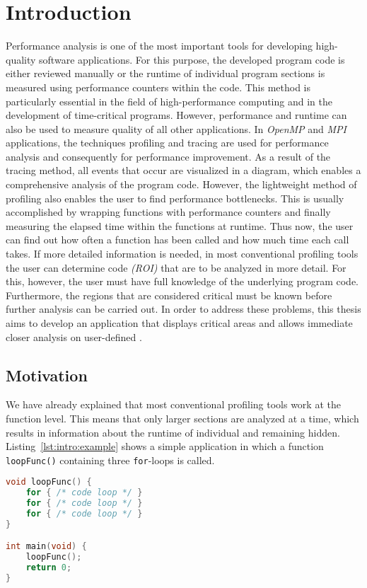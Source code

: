 \chapter{Introduction}
\label{chapter1}
Performance analysis is one of the most important tools for developing high-quality software applications. For this purpose, the developed program code is either reviewed manually or the runtime of individual program sections is measured using performance counters within the code. This method is particularly essential in the field of high-performance computing and in the development of time-critical programs. However, performance and runtime can also be used to measure quality of all other applications. In \emph{OpenMP} and \emph{MPI} applications, the techniques profiling and tracing are used for performance analysis and consequently for performance improvement. As a result of the tracing method, all events that occur are visualized in a diagram, which enables a comprehensive analysis of the program code. However, the lightweight method of profiling also enables the user to find performance bottlenecks. This is usually accomplished by wrapping functions with performance counters and finally measuring the elapsed time within the functions at runtime. Thus now, the user can find out how often a function has been called and how much time each call takes. If more detailed information is needed, in most conventional profiling tools the user can determine code \ROI\emph{(ROI)} that are to be analyzed in more detail. For this, however, the user must have full knowledge of the underlying program code. Furthermore, the regions that are considered critical must be known before further analysis can be carried out. In order to address these problems, this thesis aims to develop an application that displays critical areas and allows immediate closer analysis on user-defined \roismall. 

\section{Motivation}
We have already explained that most conventional profiling tools work at the function level. This means that only larger sections are analyzed at a time, which results in information about the runtime of individual \STATS and \declssmall remaining hidden. Listing~\ref{lst:intro:example} shows a simple \CPP application in which a function \lstinline{loopFunc()} containing three \lstinline{for}-loops is called. 

\begin{lstlisting}[float, language=C++, caption=Example Code Showing a Simple \CPP Application., label=lst:intro:example]
void loopFunc() {
    for { /* code loop */ }
    for { /* code loop */ }
    for { /* code loop */ }
}

int main(void) {
    loopFunc();
    return 0;
}
\end{lstlisting} 

